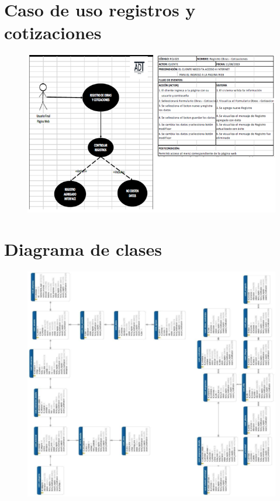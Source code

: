 \documentclass[12pt,a4paper]{article}
\begin{document}
\section*{Caso de uso registros y cotizaciones}
\begin{figure}[hbtp]
\caption{}
\centering
\includegraphics[scale=0.5]{DECIMA.png}
\end{figure}


\section*{Diagrama de clases}
\begin{figure}[hbtp]
\caption{}
\centering
\includegraphics[scale=0.5]{UNDECIMA.png}
\end{figure}
\end{document}
